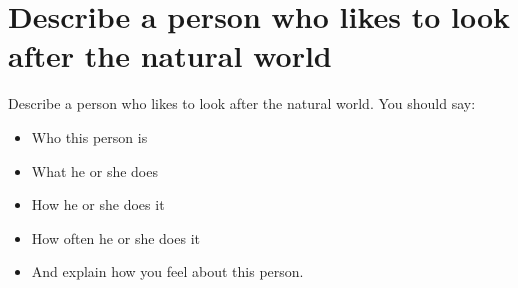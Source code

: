 \section{Describe a person who likes to look after the natural world}
\begin{ieltsprompt}
Describe a person who likes to look after the natural world.
You should say:
\begin{itemize}[leftmargin=2em, itemsep=2pt]
\item Who this person is
\item What he or she does
\item How he or she does it
\item How often he or she does it
\item And explain how you feel about this person.
\end{itemize}
\end{ieltsprompt}
